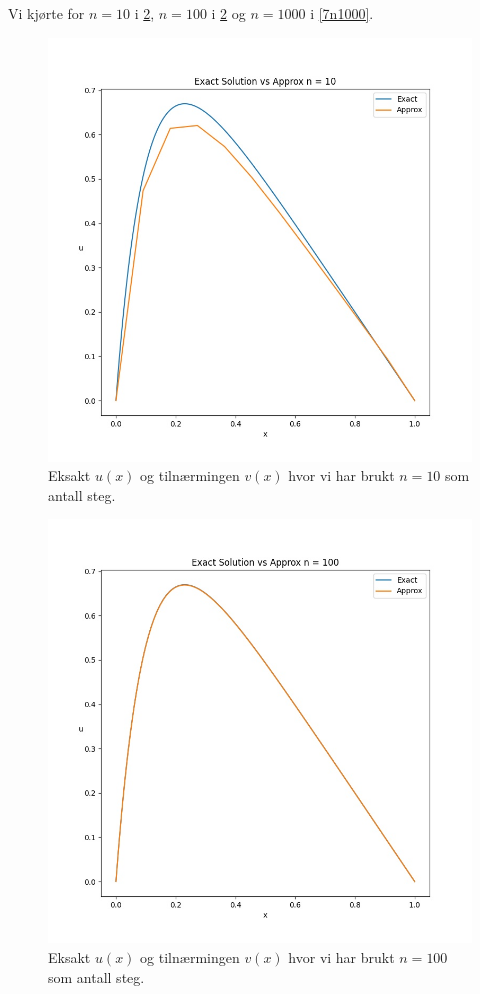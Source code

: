 \documentclass[english,notitlepage]{revtex4-1}  %
\begin{document}
Vi kjørte for $n = 10$ i \ref{7n100}, $n = 100$ i \ref{7n100} og $n = 1000$ i \ref{7n1000}. 

\begin{figure}[h]
\centering
\includegraphics[scale=0.60]{Images/problem7NEW10.jpg}
\caption{Eksakt $u(x)$ og tilnærmingen $v(x)$ hvor vi har brukt $n = 10$ som antall steg.}
\label{7n10}
\end{figure}

\begin{figure}[h]
\centering
\includegraphics[scale=0.60]{Images/problem7NEW100.jpg}
\caption{Eksakt $u(x)$ og tilnærmingen $v(x)$ hvor vi har brukt $n = 100$ som antall steg.}
\label{7n100}
\end{figure}
\end{document}
